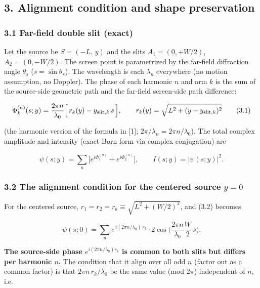 \documentclass[
]{article}
\begin{document}
\subsection{3. Alignment condition and shape
preservation}\label{alignment-condition-and-shape-preservation}

\subsubsection{3.1 Far-field double slit
(exact)}\label{far-field-double-slit-exact}

Let the source be \(S=(-L,\,y)\) and the slits \(A_1=(0,+W/2)\),
\(A_2=(0,-W/2)\). The screen point is parametrized by the far-field
diffraction angle \(\theta_s\) (\(s=\sin\theta_s\)). The wavelength is
each \(\lambda_n\) everywhere (no motion assumption, no Doppler). The
phase of each harmonic \(n\) and arm \(k\) is the sum of the source-side
geometric path and the far-field screen-side path difference:

\[
\Phi_k^{(n)}(s;y)=\frac{2\pi n}{\lambda_0}\Big[\,r_k(y)-y_{{\rm slit},k}\,s\,\Big],
\qquad r_k(y)=\sqrt{L^2+(y-y_{{\rm slit},k})^2}
\tag{3.1}
\]

(the harmonic version of the formula in {[}1{]};
\(2\pi/\lambda_n=2\pi n/\lambda_0\)). The total complex amplitude and
intensity (exact Born form via complex conjugation) are

\[
\psi(s;y)=\sum_{n}\Big[e^{i\Phi_1^{(n)}}+e^{i\Phi_2^{(n)}}\Big],
\qquad I(s;y)=\big|\psi(s;y)\big|^2.
\tag{3.2}
\]

\subsubsection{\texorpdfstring{3.2 The alignment condition for the
centered source
\(y=0\)}{3.2 The alignment condition for the centered source y=0}}\label{the-alignment-condition-for-the-centered-source-y0}

For the centered source, \(r_1=r_2=r_k\equiv\sqrt{L^2+(W/2)^2}\), and
(3.2) becomes

\[
\psi(s;0)=\sum_n e^{\,i(2\pi n/\lambda_0)\,r_k}\cdot 2\cos\!\Big(\frac{2\pi n}{\lambda_0}\frac{W}{2}\,s\Big).
\tag{3.3}
\]

\textbf{The source-side phase \(e^{i(2\pi n/\lambda_0)r_k}\) is common
to both slits but differs per harmonic \(n\).} The condition that it
align over all odd \(n\) (factor out as a common factor) is that
\(2\pi n\,r_k/\lambda_0\) be the same value (mod \(2\pi\)) independent
of \(n\), i.e.
\end{document}
